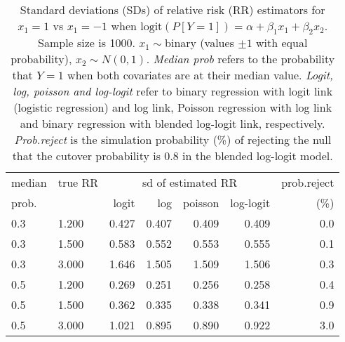 \documentclass[12pt,a4paper]{article}
\begin{document}
\begin{table}[H] 
\small\sf\centering 
\caption{Standard deviations (SDs) of relative risk (RR) estimators for $x_1=1$ vs $x_1=-1$ when $\mbox{logit}(P[Y=1])=\alpha+\beta_1 x_1 + \beta_2 x_2$. Sample size is 1000. $x_1 \sim $binary (values $\pm 1$ with equal probability), $x_2 \sim N(0,1)$. {\it Median prob} refers to the probability that $Y=1$ when both covariates are at their median value. {\it Logit, log, poisson and log-logit} refer to binary regression with logit link (logistic regression) and log link, Poisson regression with log link and binary regression with blended log-logit link, respectively. {\it Prob.reject} is the simulation probability (\%) of rejecting the null that the cutover probability is $0.8$ in the blended log-logit model.} 
\begin{tabular}{llrrrrr} 
\toprule 
median & true RR & \multicolumn{4}{c}{sd of estimated RR} & prob.reject \\ 
prob. & & logit & log & poisson & log-logit  & (\%) \\ \midrule 
0.3 & 1.200 & 0.427 & 0.407 & 0.409 & 0.409 & 0.0 \\  
0.3 & 1.500 & 0.583 & 0.552 & 0.553 & 0.555 & 0.1 \\  
0.3 & 3.000 & 1.646 & 1.505 & 1.509 & 1.506 & 0.3 \\  
0.5 & 1.200 & 0.269 & 0.251 & 0.256 & 0.258 & 0.4 \\  
0.5 & 1.500 & 0.362 & 0.335 & 0.338 & 0.341 & 0.9 \\  
0.5 & 3.000 & 1.021 & 0.895 & 0.890 & 0.922 & 3.0 \\  
\bottomrule 
\end{tabular} 
\end{table} 
\end{document}

